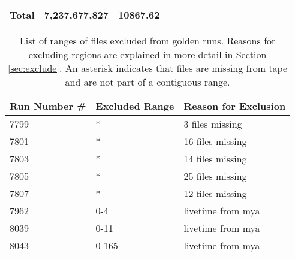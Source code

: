 \documentclass[11pt]{article}
\begin{document}
\begin{longtable}[!hbtp]{l r r}
\hline
Total	&	7,237,677,827	&	10867.62	\\
  \hline
  \hline

\end{longtable}  

\begin{table}[htp]
\caption{List of ranges of files excluded from golden runs.  Reasons for excluding regions are explained in more detail in Section \ref{sec:exclude}.  An asterisk indicates that files are missing from tape and are not part of a contiguous range.}
\begin{center}
\begin{tabular}{l l l}
Run Number \# & Excluded Range & Reason for Exclusion \\
\hline
7799 & * & 3 files missing \\
7801 & * & 16 files missing \\
7803 & * & 14 files missing \\
7805 & * & 25 files missing \\
7807 & * & 12 files missing \\
7962 & 0-4 & livetime from mya \\
8039 & 0-11 & livetime from mya \\
8043 & 0-165 & livetime from mya \\

\end{tabular}
\end{center}
\label{tbl:excluded_file_ranges}
\end{table}%
\end{document}
